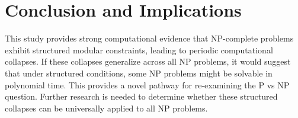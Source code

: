 \documentclass{article}
\begin{document}
\section{Conclusion and Implications}
This study provides strong computational evidence that NP-complete problems exhibit structured modular constraints, leading to periodic computational collapses.
If these collapses generalize across all NP problems, it would suggest that under structured conditions, some NP problems might be solvable in polynomial time.
This provides a novel pathway for re-examining the P vs NP question.
Further research is needed to determine whether these structured collapses can be universally applied to all NP problems.
\end{document}
